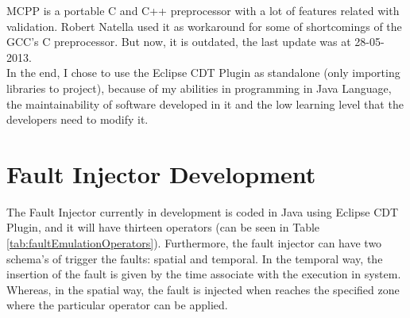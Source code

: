 MCPP is a portable C and C++ preprocessor with a lot of features related with validation. Robert Natella used it as workaround for some of shortcomings of the GCC's C preprocessor. But now, it is outdated, the last update was at 28-05-2013.\\



In the end, I chose to use the Eclipse CDT Plugin as standalone (only importing libraries to project), because of my abilities in programming in Java Language, the maintainability of software developed in it and the low learning level that the developers need to modify it.\\

\newpage
\section{Fault Injector Development}

The Fault Injector currently in development is coded in Java using Eclipse CDT Plugin, and it will have thirteen operators (can be seen in Table \ref{tab:faultEmulationOperators})\cite{duraes2005thesis}. Furthermore, the fault injector can have two schema's of trigger the faults: spatial and temporal. In the temporal way, the insertion of the fault is given by the time associate with the execution in system. Whereas, in the spatial way, the fault is injected when reaches the specified zone where the particular operator can be applied.

